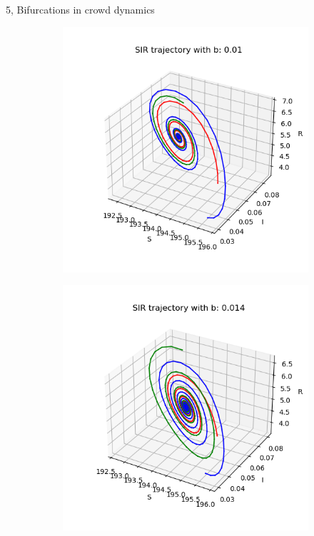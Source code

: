 \documentclass[10pt,a4paper]{article}
\begin{document}
\begin{task}{5, Bifurcations in crowd dynamics }
\begin{figure} [H]
\begin{subfigure} {0.33\textwidth}
    \centering
    \label{task5-3-1}
    \includegraphics[width=.9\linewidth]{images/0.01.png} 
\end{subfigure}
\begin{subfigure} {0.33\textwidth}
    \centering
    \label{task5-3-2}
    \includegraphics[width=.9\linewidth]{images/0.014.png} 

\end{subfigure}
\end{figure}
\end{task}
\end{document}

